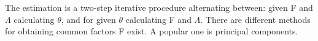 The estimation is a two-step iterative procedure alternating between: given F and $\Lambda$ calculating $\theta$, and for given $\theta$ calculating F and $\Lambda$. There are different methods for obtaining common factors F exist. A popular one is principal components.








